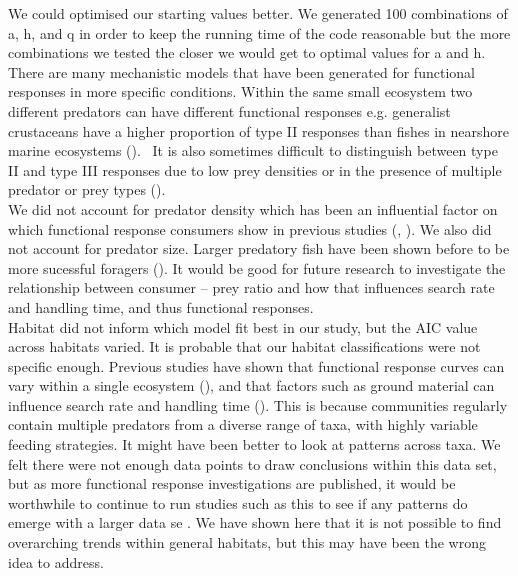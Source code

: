 \documentclass[11pt]{article}
\begin{document}
	We could optimised our starting values better. We generated 100 combinations of a, h, and q in order to keep the running time of the code reasonable but the more combinations we tested the closer we would get to optimal values for a and h. 
	There are many mechanistic models that have been generated for functional responses in more specific conditions. Within the same small ecosystem two different predators can have different functional responses e.g. generalist crustaceans have a higher proportion of type II responses than fishes in nearshore marine ecosystems (\cite{Dunn2020}).  It is also sometimes difficult to distinguish between type II and type III responses due to low prey densities or in the presence of multiple predator or prey types (\cite{Dunn2020}). \\

	We did not account for predator density which has been an influential factor on which functional response consumers show in previous studies (\cite{Yasuda1999}, \cite{Sarnelle2008}).  We also did not account for predator size. Larger predatory fish have been shown before to be more sucessful foragers (\cite{Dunn2020}). It would be good for future research to investigate the relationship between consumer – prey ratio and how that influences search rate and handling time, and thus functional responses. \\

	Habitat did not inform which model fit best in our study, but the AIC value across habitats varied. It is probable that our habitat classifications were not specific enough. Previous studies have shown that functional response curves can vary within a single ecosystem (\cite{Dunn2020}), and that factors such as ground material can influence search rate and handling time (\cite{Lipcius1986a}). This is because communities regularly contain multiple predators from a diverse range of taxa, with highly variable feeding strategies. It might have been better to look at patterns across taxa. We felt there were not enough data points to draw conclusions within this data set, but as more functional response investigations are published, it would be worthwhile to continue to run studies such as this to see if any patterns do emerge with a larger data se . We have shown here that it is not possible to find overarching trends within general habitats, but this may have been the wrong idea to address. \\
\end{document}
